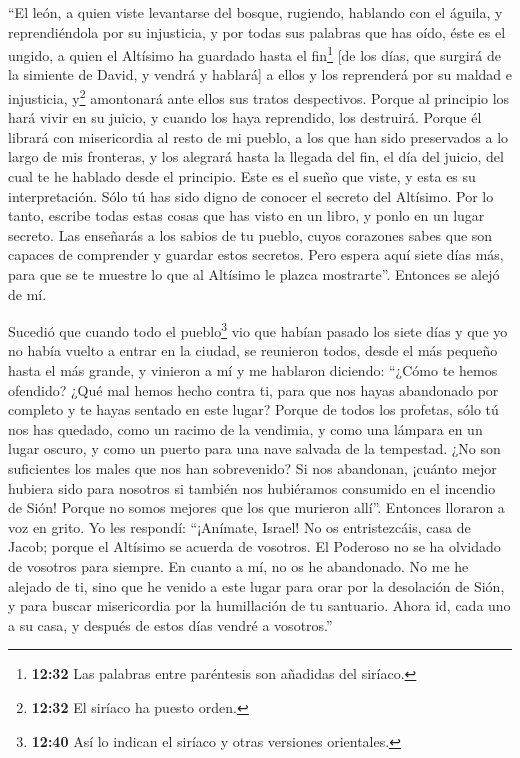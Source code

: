  ``El león, a quien viste levantarse del bosque,
rugiendo, hablando con el águila, y reprendiéndola por su injusticia, y
por todas sus palabras que has oído,  éste es el ungido,
a quien el Altísimo ha guardado hasta el fin\footnote{\textbf{12:32} Las
  palabras entre paréntesis son añadidas del siríaco.} {[}de los días,
que surgirá de la simiente de David, y vendrá y hablará{]} a ellos y los
reprenderá por su maldad e injusticia, y\footnote{\textbf{12:32} El
  siríaco ha puesto orden.} amontonará ante ellos sus tratos
despectivos.  Porque al principio los hará vivir en su
juicio, y cuando los haya reprendido, los destruirá. 
Porque él librará con misericordia al resto de mi pueblo, a los que han
sido preservados a lo largo de mis fronteras, y los alegrará hasta la
llegada del fin, el día del juicio, del cual te he hablado desde el
principio.  Este es el sueño que viste, y esta es su
interpretación.  Sólo tú has sido digno de conocer el
secreto del Altísimo.  Por lo tanto, escribe todas estas
cosas que has visto en un libro, y ponlo en un lugar secreto.
 Las enseñarás a los sabios de tu pueblo, cuyos corazones
sabes que son capaces de comprender y guardar estos secretos.
 Pero espera aquí siete días más, para que se te muestre
lo que al Altísimo le plazca mostrarte''. Entonces se alejó de mí.

 Sucedió que cuando todo el pueblo\footnote{\textbf{12:40}
  Así lo indican el siríaco y otras versiones orientales.} vio que
habían pasado los siete días y que yo no había vuelto a entrar en la
ciudad, se reunieron todos, desde el más pequeño hasta el más grande, y
vinieron a mí y me hablaron diciendo:  ``¿Cómo te hemos
ofendido? ¿Qué mal hemos hecho contra ti, para que nos hayas abandonado
por completo y te hayas sentado en este lugar?  Porque de
todos los profetas, sólo tú nos has quedado, como un racimo de la
vendimia, y como una lámpara en un lugar oscuro, y como un puerto para
una nave salvada de la tempestad.  ¿No son suficientes
los males que nos han sobrevenido?  Si nos abandonan,
¡cuánto mejor hubiera sido para nosotros si también nos hubiéramos
consumido en el incendio de Sión!  Porque no somos
mejores que los que murieron allí''. Entonces lloraron a voz en grito.
Yo les respondí:  ``¡Anímate, Israel! No os
entristezcáis, casa de Jacob;  porque el Altísimo se
acuerda de vosotros. El Poderoso no se ha olvidado de vosotros para
siempre.  En cuanto a mí, no os he abandonado. No me he
alejado de ti, sino que he venido a este lugar para orar por la
desolación de Sión, y para buscar misericordia por la humillación de tu
santuario.  Ahora id, cada uno a su casa, y después de
estos días vendré a vosotros.''

